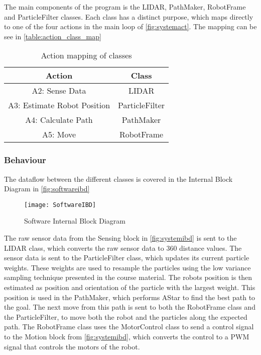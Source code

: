 \documentclass[Main]{subfiles}
\begin{document}
		The main components of the program is the LIDAR, PathMaker, RobotFrame and ParticleFilter classes. 
		Each class has a distinct purpose, which maps directly to one of the four  actions in the main loop of \autoref{fig:systemact}.
		The mapping can be see in \autoref{table:action_class_map}
		 
		\begin{table}[H]
			\centering
			\begin{tabular}{|c|c|}
			\hline
				Action & Class \\ 
			\hline
				A2: Sense Data & LIDAR  \\ 
			\hline
				A3: Estimate Robot Position & ParticleFilter  \\ 
			\hline
				A4: Calculate Path & PathMaker  \\ 
			\hline
				A5: Move & RobotFrame  \\ 
			\hline
			\end{tabular}
			\caption{Action mapping of classes}
			\label{table:action_class_map} 
		\end{table} \noindent
		
	\subsubsection{Behaviour} %
	\label{subsub:software_behaviour}

		The dataflow between the different classes is covered in the Internal Block Diagram in \autoref{fig:softwareibd}
		
		\begin{figure}[H]
			\centering
			\texttt{[image: SoftwareIBD]}
			\caption{Software Internal Block Diagram}
			\label{fig:softwareibd}
		\end{figure}

		The raw sensor data from the Sensing block in \autoref{fig:systemibd} is sent to the LIDAR class, which  converts the raw sensor data to 360 distance values.
		The sensor data is sent to the ParticleFilter class, which updates its current particle weights. 
		These weights are used to resample the particles using the low variance sampling technique presented in the course material.
		The robots position is then estimated as position and orientation of the particle with the largest weight.
		This position is used in the PathMaker, which performs AStar to find the best path to the goal. 
		The next move from this path is sent to both the RobotFrame class and the ParticleFilter, to move both the robot and the particles along the expected path.
		The RobotFrame class uses the MotorControl class to send a control signal to the Motion block from \autoref{fig:systemibd}, which converts the control to a PWM signal that controls the motors of the robot.
		
\end{document}
